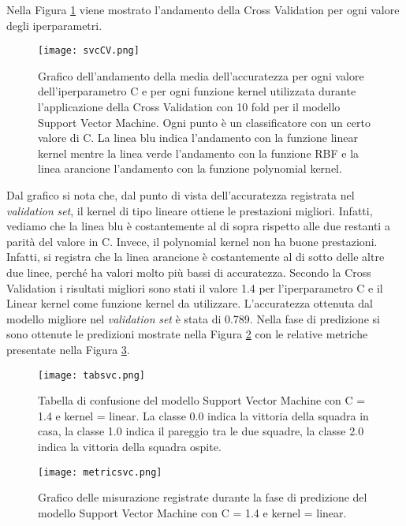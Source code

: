 Nella Figura \ref{fig:svcCV} viene mostrato l'andamento della Cross Validation per ogni valore degli iperparametri.
\begin{figure}[]
	\begin{center}
		\texttt{[image: svcCV.png]}
		\caption{Grafico dell'andamento della media dell'accuratezza per ogni valore dell'iperparametro C e per ogni funzione kernel utilizzata durante l'applicazione della Cross Validation con 10 fold per il modello Support Vector Machine. Ogni punto è un classificatore con un certo valore di C. La linea blu indica l'andamento con la funzione linear kernel mentre la linea verde l'andamento con la funzione RBF e	la linea arancione l'andamento con la funzione polynomial kernel.
		} 
		\label{fig:svcCV}
	\end{center}
\end{figure}
Dal grafico si nota che, dal punto di vista dell'accuratezza registrata nel \emph{validation} \emph{set}, il kernel di tipo lineare ottiene le prestazioni migliori. Infatti, vediamo che la linea blu è costantemente al di sopra rispetto alle due restanti a parità del valore in \textsf{C}. Invece, il polynomial kernel non ha buone prestazioni. Infatti, si registra che la linea arancione è costantemente al di sotto delle altre due linee, perché ha valori molto più bassi di accuratezza. Secondo la Cross Validation i risultati migliori sono stati il valore 1.4 per l'iperparametro \textsf{C} e il Linear kernel come funzione \textsf{kernel} da utilizzare. L'accuratezza ottenuta dal modello migliore nel \emph{validation} \emph{set} è stata di 0.789. Nella fase di predizione si sono ottenute le predizioni mostrate nella Figura \ref{fig:tabsvc} con le relative metriche presentate nella Figura \ref{fig:svcmetrics}.
\begin{figure}[]
	\begin{center}
		\texttt{[image: tabsvc.png]}
		\caption{Tabella di confusione del modello Support Vector Machine con \textsf{C} = 1.4 e \textsf{kernel} = linear. La classe 0.0 indica la vittoria della squadra in casa, la classe 1.0 indica il pareggio tra le due squadre, la classe 2.0 indica la vittoria della squadra ospite.
		} 
		\label{fig:tabsvc}
	\end{center}
\end{figure}
\begin{figure}[]
	\begin{center}
		\texttt{[image: metricsvc.png]}
		\caption{Grafico delle misurazione registrate durante la fase di predizione del modello Support Vector Machine con \textsf{C} = 1.4 e \textsf{kernel} = linear.
		} 
		\label{fig:svcmetrics}
	\end{center}
\end{figure}
